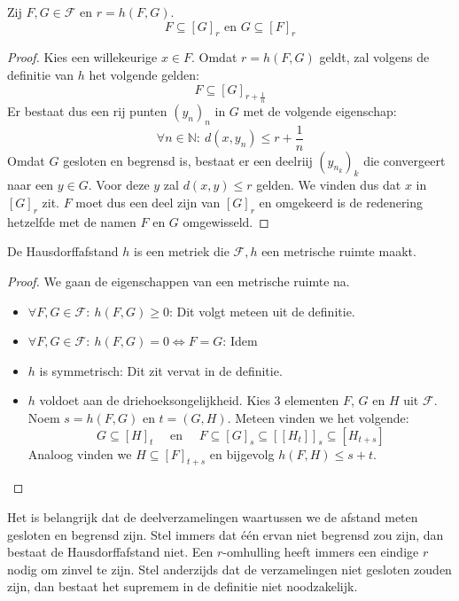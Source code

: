 \documentclass[main.tex]{subfiles}
\begin{document}
\begin{blem}
  Zij $F,G \in \mathcal{F}$ en $r=h(F,G)$.
  \[ F \subseteq [G]_{r} \text{ en } G \subseteq [F]_{r} \]

  \begin{proof}
    Kies een willekeurige $x\in F$.
    Omdat $r = h(F,G)$ geldt, zal volgens de definitie van $h$ het volgende gelden:
    \[ F \subseteq [G]_{r+\frac{1}{n}}\]
    Er bestaat dus een rij punten $(y_{n})_{n}$ in $G$ met de volgende eigenschap:
    \[ \forall n \in \mathbb{N}:\ d(x,y_{n}) \le r + \frac{1}{n} \]
    Omdat $G$ gesloten en begrensd is, bestaat er een deelriij $(y_{n_{k}})_{k}$ die convergeert naar een $y\in G$.
    Voor deze $y$ zal $d(x,y) \le r$ gelden.
    We vinden dus dat $x$ in $[G]_{r}$ zit.
    $F$ moet dus een deel zijn van $[G]_{r}$ en omgekeerd is de redenering hetzelfde met de namen $F$ en $G$ omgewisseld.
  \end{proof}
\end{blem}

\begin{pr}
  De Hausdorffafstand $h$ is een metriek die $\mathcal{F},h$ een metrische ruimte maakt.

  \begin{proof}
    We gaan de eigenschappen van een metrische ruimte na.
    \begin{itemize}
    \item $\forall F,G\in \mathcal{F}:\ h(F,G) \ge 0$: Dit volgt meteen uit de definitie.
    \item $\forall F,G\in \mathcal{F}:\ h(F,G) = 0 \Leftrightarrow F = G$: Idem
    \item $h$ is symmetrisch: Dit zit vervat in de definitie.
    \item $h$ voldoet aan de driehoeksongelijkheid.
      Kies 3 elementen $F$, $G$ en $H$ uit $\mathcal{F}$.
      Noem $s=h(F,G)$ en $t=(G,H)$.
      Meteen vinden we het volgende:
      \[ G \subseteq [H]_{t} \quad\text{ en }\quad F \subseteq [G]_{s} \subseteq \left[[H_{t}]\right]_{s} \subseteq [H_{t+s}] \]
      Analoog vinden we $H \subseteq [F]_{t+s}$ en bijgevolg $h(F,H) \le s+t$.\needed
    \end{itemize}
  \end{proof}
\end{pr}

\begin{opm}
  Het is belangrijk dat de deelverzamelingen waartussen we de afstand meten gesloten en begrensd zijn.
  Stel immers dat \'e\'en ervan niet begrensd zou zijn, dan bestaat de Hausdorffafstand niet.
  Een $r$-omhulling heeft immers een eindige $r$ nodig om zinvel te zijn.
  Stel anderzijds dat de verzamelingen niet gesloten zouden zijn, dan bestaat het supremem in de definitie niet noodzakelijk.
\end{opm}
\end{document}
